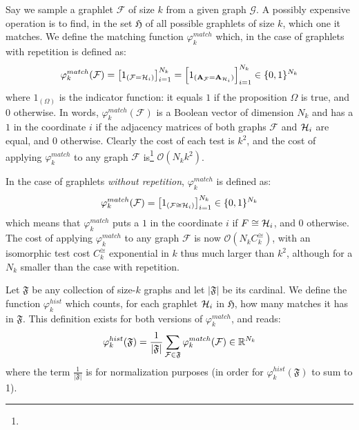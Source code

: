 Say we sample a graphlet $\mathcal{F}$ of size $k$ from a given graph $\mathcal{G}$. A possibly expensive operation is to find, in the set $\mathfrak{H}$ of all possible graphlets of size $k$, which one it matches. We define the matching function $\varphi_{k}^{match}$ which, in the case of graphlets with repetition is defined as: 
\[
\varphi_k^{match}(\mathcal{F}) = \left[ 1_{(\mathcal{F} = \mathcal{H}_i)}\right]_{i=1}^{N_k}= \left[ 1_{(\mathbf{A}_\mathcal{F} = \mathbf{A}_{\mathcal{H}_i})}\right]_{i=1}^{N_k} \in \{0,1\}^{N_k}
\]
where $1_{(\Omega)}$ is the indicator function: it equals $1$ if the proposition $\Omega$ is true, and $0$ otherwise. 
In words, $\varphi_k^{match}(\mathcal{F})$ is a Boolean vector of dimension $N_k$ and has a $1$ in the coordinate $i$ if the adjacency matrices of both graphs $\mathcal{F}$ and $\mathcal{H}_i$ are equal, and $0$ otherwise. Clearly the cost of each test is $k^2$, and the cost of applying $\varphi^{match}_k$ to any graph $\mathcal{F}$ is\footnote{} $\mathcal{O}(N_k k^2)$. 

In the case of graphlets \emph{without repetition}, $\varphi_k^{match}$ is defined as:
\[
\varphi_k^{match}(\mathcal{F}) = \left[ 1_{(\mathcal{F} \cong \mathcal{H}_i)}\right]_{i=1}^{N_k} \in \{0,1\}^{N_k}
\]
which means that $\varphi_k^{match}$ puts a $1$ in the coordinate $i$ if $F\cong \mathcal{H}_i$, and $0$ otherwise. The cost of applying $\varphi^{match}_k$ to any graph $\mathcal{F}$ is now $\mathcal{O}(N_k C^{\cong}_k)$, with an isomorphic test cost $C^{\cong}_k$ exponential in $k$ thus much larger than $k^2$, although for a $N_k$ smaller than the case with repetition.  

Let $\mathfrak{F}$ be any collection of size-$k$ graphs and let $|\mathfrak{F}|$ be its cardinal. We define the function $\varphi_k^{hist}$ which counts, for each graphlet $\mathcal{H}_i$ in $\mathfrak{H}$, how many matches it has in $\mathfrak{F}$. This definition exists for both versions of $\varphi_k^{match}$, and reads:
\begin{align}
	\label{eq:def:phi_hist}
	\varphi_k^{hist}(\mathfrak{F})=\frac{1}{|\mathfrak{F}|}\sum_{\mathcal{F}\in\mathfrak{F}} \varphi_k^{match} (\mathcal{F}) \in \mathbb{R}^{N_k}
\end{align}
where the term $\frac{1}{|\mathfrak{F}|}$ is for normalization purposes (in order for  $\varphi_k^{hist}(\mathfrak{F})$ to sum to 1). %


